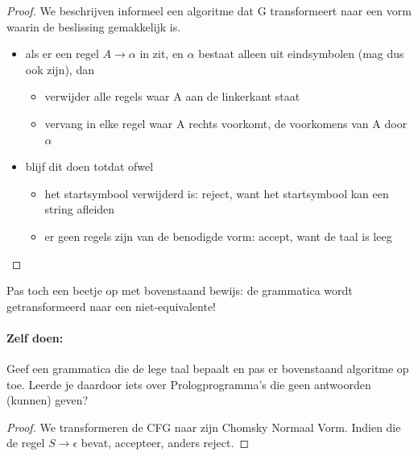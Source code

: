 \begin{proof}
We beschrijven informeel een algoritme dat G transformeert naar een
vorm waarin de beslissing gemakkelijk is.
\begin{itemize}
\item
als er een regel $A \rightarrow \alpha$ in zit, en $\alpha$ bestaat
alleen uit eindsymbolen (mag dus ook \eps zijn), dan
\begin{itemize}
\item verwijder alle regels waar A aan de linkerkant staat
\item vervang in elke regel waar A rechts voorkomt, de voorkomens van
A door $\alpha$
\end{itemize}


\item
blijf dit doen totdat ofwel
\begin{itemize}
\item het startsymbool verwijderd is: reject, want het startsymbool
kan een string afleiden
\item er geen regels zijn van de benodigde vorm: accept, want de taal
is leeg
\end{itemize}
\end{itemize}
\end{proof}

Pas toch een beetje op met bovenstaand bewijs: de grammatica wordt
getransformeerd naar een niet-equivalente!


\paragraph{Zelf doen:}
Geef een grammatica die de lege taal bepaalt en pas er bovenstaand
algoritme op toe. Leerde je daardoor iets over Prologprogramma's die
geen antwoorden (kunnen) geven?



\begin{proof}
We transformeren de CFG naar zijn Chomsky Normaal Vorm. Indien die de
regel $S \rightarrow \epsilon$ bevat, accepteer, anders reject.
\end{proof}


